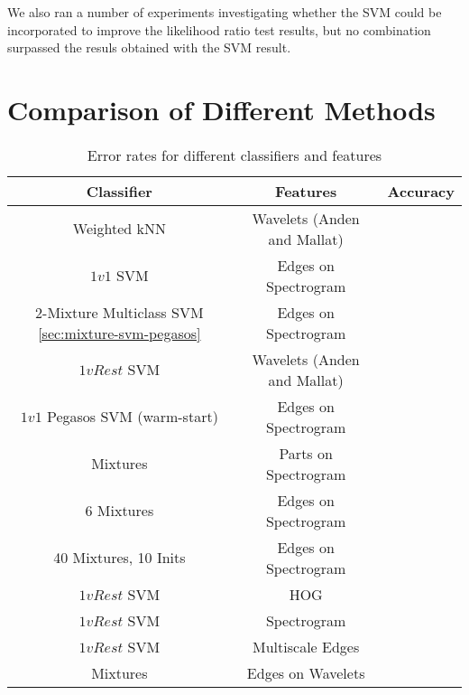 \documentclass{article}
\begin{document}
We also ran a number of experiments investigating whether the SVM could be incorporated to improve the likelihood ratio test results, 
but no combination surpassed the resuls obtained with the
SVM result.

\section{Comparison of Different Methods}

\begin{table}[h]
  \centering
  \begin{tabular}{| c | c | c |}
    \hline
     Classifier & Features & Accuracy \\ \hline\hline
     Weighted kNN & Wavelets (Anden and Mallat) &  \\
     \hline
     $1v1$ SVM & Edges on Spectrogram  &  \\
     \hline
     2-Mixture Multiclass SVM \ref{sec:mixture-svm-pegasos} & Edges on Spectrogram  & \\
     \hline
     $1vRest$ SVM & Wavelets (Anden and Mallat) &  \\ 
     \hline
     $1v1$ Pegasos SVM (warm-start) & Edges on Spectrogram & \\
     \hline
     Mixtures & Parts on Spectrogram &  \\
     \hline
     6 Mixtures & Edges on Spectrogram &  \\
     \hline
     40 Mixtures, 10 Inits & Edges on Spectrogram &  \\
     \hline
     $1vRest$ SVM & HOG &  \\
     \hline
     $1vRest$ SVM & Spectrogram &  \\
     \hline
     $1vRest$ SVM & Multiscale Edges &  \\
     \hline
     Mixtures & Edges on Wavelets &  \\
     \hline

  \end{tabular}
  \caption{Error rates for different classifiers and features}
  \label{tab:comparison}
\end{table}
\end{document}
